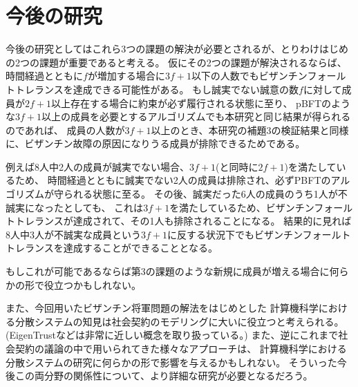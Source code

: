 \section{今後の研究}
今後の研究としてはこれら3つの課題の解決が必要とされるが、とりわけはじめの2つの課題が重要であると考える。
仮にその2つの課題が解決されるならば、
時間経過とともに$f$が増加する場合に$3f+1$以下の人数でもビザンチンフォールトトレランスを達成できる可能性がある。
もし誠実でない誠意の数$f$に対して成員が$2f+1$以上存在する場合に約束が必ず履行される状態に至り、
pBFT\cite{castro1999}のような$3f+1$以上の成員を必要とするアルゴリズムでも本研究と同じ結果が得られるのであれば、
成員の人数が$3f+1$以上のとき、本研究の補題3の検証結果と同様に、ビザンチン故障の原因になりうる成員が排除できるためである。

例えば8人中2人の成員が誠実でない場合、$3f+1$(と同時に$2f+1$)を満たしているため、
時間経過とともに誠実でない2人の成員は排除され、必ずPBFTのアルゴリズムが守られる状態に至る。
その後、誠実だった6人の成員のうち1人が不誠実になったとしても、
これは$3f+1$を満たしているため、ビザンチンフォールトトレランスが達成されて、その1人も排除されることになる。
結果的に見れば8人中3人が不誠実な成員という$3f+1$に反する状況下でもビザンチンフォールトトレランスを達成することができることとなる。

もしこれが可能であるならば第3の課題のような新規に成員が増える場合に何らかの形で役立つかもしれない。

また、今回用いたビザンチン将軍問題の解法をはじめとした
計算機科学における分散システムの知見は社会契約のモデリングに大いに役立つと考えられる。
(EigenTrust\cite{kamvar2003}などは非常に近しい概念を取り扱っている。)
また、逆にこれまで社会契約の議論の中で用いられてきた様々なアプローチは、
計算機科学における分散システムの研究に何らかの形で影響を与えるかもしれない。
そういった今後この両分野の関係性について、より詳細な研究が必要となるだろう。
